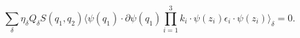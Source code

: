 \begin{equation}
\sum_\delta \eta_\delta Q_\delta S(q_1,q_2) \langle
\psi(q_1)\cdot\partial\psi(q_1)\prod_{i=1}^3 k_i\cdot\psi(z_i)
\epsilon_i\cdot\psi(z_i)\rangle_\delta =0.
\end{equation}

